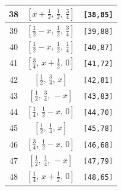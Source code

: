 \documentclass[fleqn,8pt]{jsarticle}
\begin{document}
\begin{longtable}{ccc}
38 & $\left[ x + \frac{1}{2},\, \frac{1}{2},\, \frac{3}{4} \right]$ & {\tt [38,85]} \\ \hline
39 & $\left[ \frac{1}{2} - x,\, \frac{1}{2},\, \frac{3}{4} \right]$ & {\tt [39,88]} \\ \hline
40 & $\left[ \frac{1}{2} - x,\, \frac{1}{2},\, \frac{1}{4} \right]$ & {\tt [40,87]} \\ \hline
41 & $\left[ \frac{3}{4},\, x + \frac{1}{2},\, 0 \right]$ & {\tt [41,72]} \\ \hline
42 & $\left[ \frac{1}{2},\, \frac{3}{4},\, x \right]$ & {\tt [42,81]} \\ \hline
43 & $\left[ \frac{1}{2},\, \frac{3}{4},\, - x \right]$ & {\tt [43,83]} \\ \hline
44 & $\left[ \frac{1}{4},\, \frac{1}{2} - x,\, 0 \right]$ & {\tt [44,70]} \\ \hline
45 & $\left[ \frac{1}{2},\, \frac{1}{4},\, x \right]$ & {\tt [45,78]} \\ \hline
46 & $\left[ \frac{3}{4},\, \frac{1}{2} - x,\, 0 \right]$ & {\tt [46,68]} \\ \hline
47 & $\left[ \frac{1}{2},\, \frac{1}{4},\, - x \right]$ & {\tt [47,79]} \\ \hline
48 & $\left[ \frac{1}{4},\, x + \frac{1}{2},\, 0 \right]$ & {\tt [48,65]} \\
\end{longtable}
\renewcommand{\arraystretch}{1.2}
\end{document}
